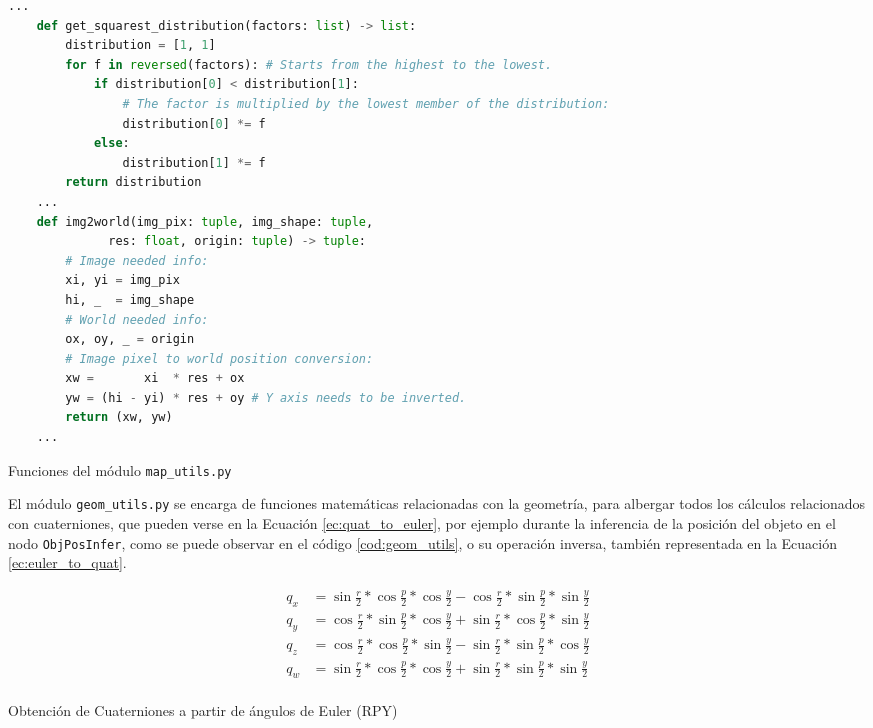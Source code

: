 \begin{code}[h!]
  \begin{lstlisting}[language=Python]
    ...
    def get_squarest_distribution(factors: list) -> list:
        distribution = [1, 1]
        for f in reversed(factors): # Starts from the highest to the lowest.
            if distribution[0] < distribution[1]:
                # The factor is multiplied by the lowest member of the distribution:
                distribution[0] *= f
            else:
                distribution[1] *= f
        return distribution
    ...
    def img2world(img_pix: tuple, img_shape: tuple,
              res: float, origin: tuple) -> tuple:
        # Image needed info:
        xi, yi = img_pix
        hi, _  = img_shape
        # World needed info:
        ox, oy, _ = origin
        # Image pixel to world position conversion:
        xw =       xi  * res + ox
        yw = (hi - yi) * res + oy # Y axis needs to be inverted.
        return (xw, yw)
    ...
  \end{lstlisting}
\caption[Funciones del módulo \texttt{map\_utils.py}]{Funciones del módulo \texttt{map\_utils.py}}
\label{cod:map_utils}
\end{code}

El módulo \texttt{geom\_utils.py} se encarga de funciones matemáticas
relacionadas con la geometría, para albergar todos los cálculos relacionados con
cuaterniones, que pueden verse en la Ecuación \ref{ec:quat_to_euler}, por
ejemplo durante la inferencia de la posición del objeto en el nodo
\verb|ObjPosInfer|, como se puede observar en el código \ref{cod:geom_utils}, o
su operación inversa, también representada en la Ecuación
\ref{ec:euler_to_quat}.
\\

\begin{myequation}[h!]
  \begin{equation}
  \begin{aligned}
  q_x &= \sin{\frac{r}{2}} * \cos{\frac{p}{2}} * \cos{\frac{y}{2}} - \cos{\frac{r}{2}} * \sin{\frac{p}{2}} * \sin{\frac{y}{2}}  \\
  q_y &= \cos{\frac{r}{2}} * \sin{\frac{p}{2}} * \cos{\frac{y}{2}} + \sin{\frac{r}{2}} * \cos{\frac{p}{2}} * \sin{\frac{y}{2}}  \\
  q_z &= \cos{\frac{r}{2}} * \cos{\frac{p}{2}} * \sin{\frac{y}{2}} - \sin{\frac{r}{2}} * \sin{\frac{p}{2}} * \cos{\frac{y}{2}}  \\
  q_w &= \sin{\frac{r}{2}} * \cos{\frac{p}{2}} * \cos{\frac{y}{2}} + \sin{\frac{r}{2}} * \sin{\frac{p}{2}} * \sin{\frac{y}{2}}  \\
  \end{aligned}
  \label{ec:quat_to_euler}
  \end{equation}
  \caption[Obtención de Cuaterniones a partir de ángulos de Euler (RPY)]{Obtención de Cuaterniones a partir de ángulos de Euler (RPY)}
\end{myequation}

